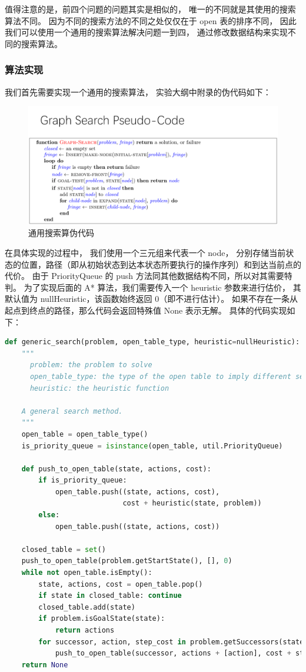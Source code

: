 \documentclass[12pt,onecolumn]{report}
\theoremstyle{plain}
\numberwithin{figure}{section}
\begin{document}
值得注意的是，前四个问题的问题其实是相似的，
唯一的不同就是其使用的搜索算法不同。
因为不同的搜索方法的不同之处仅仅在于 open 表的排序不同，
因此我们可以使用一个通用的搜索算法解决问题一到四，
通过修改数据结构来实现不同的搜索算法。

\subsubsection{算法实现}
我们首先需要实现一个通用的搜索算法，
实验大纲中附录的伪代码如下：
\begin{figure}[h]
  \centering
  \includegraphics{figures/general_search.png}
  \caption{通用搜索算伪代码}
\end{figure}

在具体实现的过程中，
我们使用一个三元组来代表一个 node，
分别存储当前状态的位置，路径（即从初始状态到达本状态所要执行的操作序列）和到达当前点的代价。
由于 PriorityQueue 的 push 方法同其他数据结构不同，所以对其需要特判。
为了实现后面的 A* 算法，我们需要传入一个 heuristic 参数来进行估价，
其默认值为 nullHeuristic，该函数始终返回 0（即不进行估计）。
如果不存在一条从起点到终点的路径，那么代码会返回特殊值 None 表示无解。
具体的代码实现如下：
\begin{lstlisting}[language=python]
def generic_search(problem, open_table_type, heuristic=nullHeuristic):
    """
      problem: the problem to solve
      open_table_type: the type of the open table to imply different search algorithm
      heuristic: the heuristic function

    A general search method.
    """
    open_table = open_table_type()
    is_priority_queue = isinstance(open_table, util.PriorityQueue)

    def push_to_open_table(state, actions, cost):
        if is_priority_queue:
            open_table.push((state, actions, cost),
                            cost + heuristic(state, problem))
        else:
            open_table.push((state, actions, cost))

    closed_table = set()
    push_to_open_table(problem.getStartState(), [], 0)
    while not open_table.isEmpty():
        state, actions, cost = open_table.pop()
        if state in closed_table: continue
        closed_table.add(state)
        if problem.isGoalState(state):
            return actions
        for successor, action, step_cost in problem.getSuccessors(state):
            push_to_open_table(successor, actions + [action], cost + step_cost)
    return None
\end{lstlisting}
\end{document}
